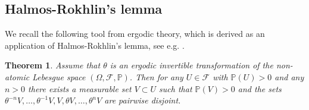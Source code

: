 \documentclass[pdflatex,sn-mathphys-num]{sn-jnl}%
\theoremstyle{thmstyleone}%
\newtheorem{theorem}{Theorem}%
\theoremstyle{thmstyletwo}%
\theoremstyle{thmstylethree}%
\newcommand{\mP}{\mathbb{P}}
\newcommand{\cF}{\mathcal{F}}
\numberwithin{equation}{section}
\begin{document}
\subsection{Halmos-Rokhlin's lemma}
%
We recall the following tool from ergodic theory, which is derived as an application of Halmos-Rokhlin's lemma, see e.g. \cite{CFS_1982}.
%
%
%
%
\begin{theorem}\label{HR_Lemma}
Assume that $\theta$ is an ergodic invertible transformation of the non-atomic Lebesgue space $(\Omega,\mathcal F,\mathbb P)$. Then for any $U\in\cF$ with $\mP(U)>0$ and any $n > 0$ there exists a measurable set $V\subset U$ such that $\mP(V)>0$ and the sets $\theta^{-n}V,\dots,\theta^{-1}V,V,\theta V,\dots,\theta^n V$ are pairwise disjoint.
\end{theorem}
%
\end{document}
